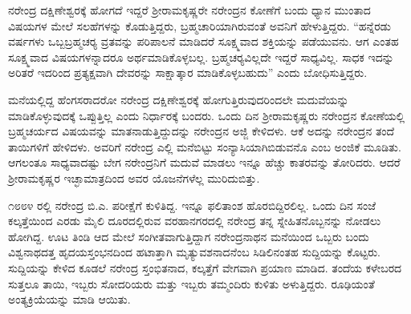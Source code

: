 \vskip 2pt

ನರೇಂದ್ರ ದಕ್ಷಿಣೇಶ್ವರಕ್ಕೆ ಹೋಗದೆ ಇದ್ದರೆ ಶ‍್ರೀರಾಮಕೃಷ್ಣರೇ ನರೇಂದ್ರನ ಕೋಣೆಗೆ ಬಂದು ಧ್ಯಾನ ಮುಂತಾದ ವಿಷಯಗಳ ಮೇಲೆ ಸಲಹೆಗಳನ್ನು ಕೊಡುತ್ತಿದ್ದರು, ಬ್ರಹ್ಮಚಾರಿಯಾಗಿರುವಂತೆ ಅವನಿಗೆ ಹೇಳುತ್ತಿದ್ದರು. “ಹನ್ನೆರಡು ವರ್ಷಗಳು ಒಬ್ಬ\break ಬ್ರಹ್ಮಚರ‍್ಯ ವ್ರತವನ್ನು ಪರಿಪಾಲನೆ ಮಾಡಿದರೆ ಸೂಕ್ಷ್ಮವಾದ ಶಕ್ತಿಯನ್ನು ಪಡೆಯುವನು. ಆಗ ಎಂತಹ ಸೂಕ್ಷ್ಮವಾದ ವಿಷಯಗಳನ್ನಾದರೂ ಅರ್ಥಮಾಡಿಕೊಳ್ಳಬಲ್ಲ. ಬ್ರಹ್ಮಚರ‍್ಯವಿಲ್ಲದೇ ಇದ್ದರೆ ಸಾಧ್ಯವಿಲ್ಲ. ಸಾಧಕ ಇದನ್ನು ಅರಿತರೆ ಇದರಿಂದ ಪ್ರತ್ಯಕ್ಷವಾಗಿ ದೇವರನ್ನು ಸಾಕ್ಷಾತ್ಕಾರ ಮಾಡಿಕೊಳ್ಳಬಹುದು” ಎಂದು ಬೋಧಿಸುತ್ತಿದ್ದರು.

\vskip 2pt

ಮನೆಯಲ್ಲಿದ್ದ ಹೆಂಗಸರಾದರೋ ನರೇಂದ್ರ ದಕ್ಷಿಣೇಶ್ವರಕ್ಕೆ ಹೋಗುತ್ತಿರುವುದ\break ರಿಂದಲೇ ಮದುವೆಯನ್ನು ಮಾಡಿಕೊಳ್ಳುವುದಕ್ಕೆ ಒಪ್ಪುತ್ತಿಲ್ಲ ಎಂದು ನಿರ್ಧಾರಕ್ಕೆ ಬಂದರು. ಒಂದು ದಿನ ಶ‍್ರೀರಾಮಕೃಷ್ಣರು ನರೇಂದ್ರನ ಕೋಣೆಯಲ್ಲಿ ಬ್ರಹ್ಮಚರ್ಯದ ವಿಷಯವನ್ನು ಮಾತನಾಡುತ್ತಿದ್ದುದನ್ನು ನರೇಂದ್ರನ ಅಜ್ಜಿ ಕೇಳಿದಳು. ಆಕೆ ಅದನ್ನು ನರೇಂದ್ರನ ತಂದೆ ತಾಯಿಗಳಿಗೆ ಹೇಳಿದಳು. ಅವರಿಗೆ ನರೇಂದ್ರ ಎಲ್ಲಿ ಮನೆಬಿಟ್ಟು ಸಂನ್ಯಾಸಿಯಾಗಿಬಿಡುವನೊ ಎಂಬ ಅಂಜಿಕೆ ಮೂಡಿತು. ಆಗಲಂತೂ ಸಾಧ್ಯವಾದಷ್ಟು ಬೇಗ ನರೇಂದ್ರನಿಗೆ ಮದುವೆ ಮಾಡಲು ಇನ್ನೂ ಹೆಚ್ಚು ಕಾತರವನ್ನು ತೋರಿದರು. ಆದರೆ ಶ‍್ರೀರಾಮಕೃಷ್ಣರ ಇಚ್ಛಾಮಾತ್ರದಿಂದ ಅವರ ಯೊಜನೆಗಳೆಲ್ಲ ಮುರಿದುಬಿತ್ತು.

೧೮೮೪ ರಲ್ಲಿ ನರೇಂದ್ರ ಬಿ.ಎ. ಪರೀಕ್ಷೆಗೆ ಕುಳಿತಿದ್ದ. ಇನ್ನೂ ಫಲಿತಾಂಶ ಹೊರಬಿದ್ದಿರಲಿಲ್ಲ. ಒಂದು ದಿನ ಸಂಜೆ ಕಲ್ಕತ್ತೆಯಿಂದ ಎರಡು ಮೈಲಿ ದೂರದಲ್ಲಿರುವ ವರಹಾನಗರದಲ್ಲಿ ನರೇಂದ್ರ ತನ್ನ ಸ್ನೇಹಿತನೊಬ್ಬನನ್ನು ನೋಡಲು ಹೋಗಿದ್ದ. ಊಟ ತಿಂಡಿ ಆದ ಮೇಲೆ ಸಂಗೀತವಾಗುತ್ತಿದ್ದಾಗ ನರೇಂದ್ರನಾಥನ ಮನೆಯಿಂದ ಒಬ್ಬರು ಬಂದು ವಿಶ್ವನಾಥದತ್ತ ಹೃದಯಸ್ತಂಭನದಿಂದ ಹಟಾತ್ತಾಗಿ ಮೃತ್ಯುವಶನಾದನೆಂಬ ಸಿಡಿಲಿನಂತಹ ಸುದ್ದಿಯನ್ನು ಕೊಟ್ಟರು. ಸುದ್ದಿಯನ್ನು ಕೇಳಿದ ಕೂಡಲೆ ನರೇಂದ್ರ ಸ್ತಂಭಿತನಾದ, ಕಲ್ಕತ್ತೆಗೆ ವೇಗವಾಗಿ ಪ್ರಯಾಣ ಮಾಡಿದ. ತಂದೆಯ ಕಳೇಬರದ ಸುತ್ತಲೂ ತಾಯಿ, ಇಬ್ಬರು ಸೋದರಿಯರು ಮತ್ತು ಇಬ್ಬರು ತಮ್ಮಂದಿರು ಕುಳಿತು ಅಳುತ್ತಿದ್ದರು. ರೂಢಿಯಂತೆ ಅಂತ್ಯಕ್ರಿಯೆಯನ್ನು ಮಾಡಿ ಆಯಿತು.

